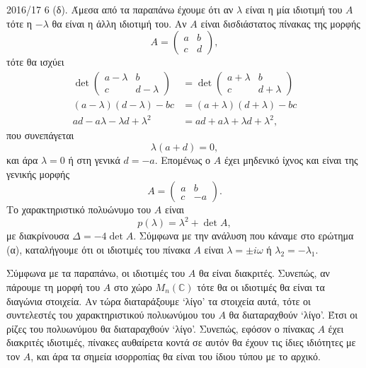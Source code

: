 \begin{solution}{2016/17 6}
    (δ). Άμεσα από τα παραπάνω έχουμε ότι αν \( \lambda \) είναι η μία ιδιοτιμή
    του \( A \) τότε η \( -\lambda \) θα είναι η άλλη ιδιοτιμή του. Αν \( A \)
    είναι δισδιάστατος πίνακας της μορφής
    \[
        A =
        \begin{pmatrix}
            a & b \\
            c & d
        \end{pmatrix},
    \]
    τότε θα ισχύει
    \begin{align*}
        \det{\begin{pmatrix}
                a - \lambda & b \\
                c & d - \lambda
        \end{pmatrix}} &=
        \det{\begin{pmatrix}
                a + \lambda & b \\
                c & d + \lambda
        \end{pmatrix}} \\
        (a - \lambda)(d - \lambda) - bc &=
        (a + \lambda)(d + \lambda) - bc \\
        ad - a\lambda - \lambda d + \lambda^2 &=
        ad + a\lambda + \lambda d + \lambda^2,
    \end{align*}
    που συνεπάγεται
    \[
        \lambda(a + d) = 0,
    \]
    και άρα \( \lambda = 0 \) ή στη γενικά \( d = -a \). Επομένως ο \( A \) έχει
    μηδενικό ίχνος και είναι της γενικής μορφής
    \[
        A =
        \begin{pmatrix}
            a & b \\
            c & -a
        \end{pmatrix}.
    \]
    Το χαρακτηριστικό πολυώνυμο του \( A \) είναι
    \[
        p(\lambda) = \lambda^2 + \det{A},
    \]
    με διακρίνουσα \( \Delta = -4 \det{A} \). Σύμφωνα με την ανάλυση που κάναμε
    στο ερώτημα (α), καταλήγουμε ότι οι ιδιοτιμές του πίνακα \( A \) είναι \(
    \lambda = \pm i\omega \) ή \( \lambda_2 = - \lambda_1 \).

    Σύμφωνα με τα παραπάνω, οι ιδιοτιμές του \( A \) θα είναι διακριτές.
    Συνεπώς, αν πάρουμε τη μορφή  του \( A \) στο χώρο \(
    M_n\left(\mathbb{C}\right) \) τότε θα οι ιδιοτιμές θα είναι τα διαγώνια
    στοιχεία. Αν τώρα διαταράξουμε \enquote*{λίγο} τα στοιχεία αυτά, τότε οι
    συντελεστές του χαρακτηριστικού πολυωνύμου του \( A \) θα διαταραχθούν
    \enquote*{λίγο}. Έτσι οι ρίζες του πολυωνύμου θα διαταραχθούν
    \enquote*{λίγο}. Συνεπώς, εφόσον ο πίνακας \( A \) έχει διακριτές ιδιοτιμές,
    πίνακες αυθαίρετα κοντά σε αυτόν θα έχουν τις ίδιες ιδιότητες με τον
    \( A \), και άρα τα σημεία ισορροπίας θα είναι του ίδιου τύπου με το αρχικό.
\end{solution}
